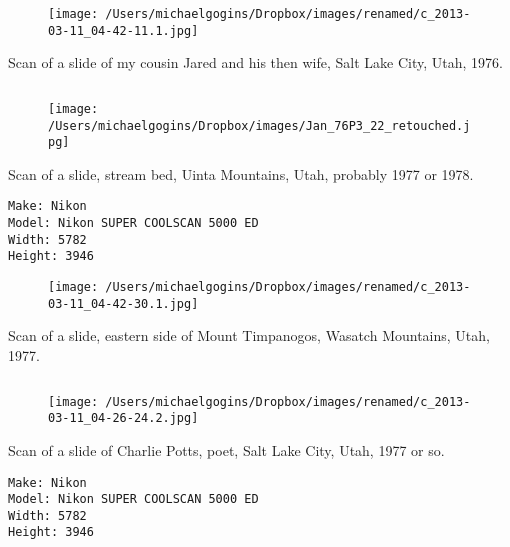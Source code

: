 \documentclass[11pt,letter,DIV=14,paper=landscape]{scrbook}
\begin{document}
\begin{figure}
\texttt{[image: /Users/michaelgogins/Dropbox/images/renamed/c\_2013-03-11\_04-42-11.1.jpg]}
\end{figure}
    
\clearpage
\noindent Scan of a slide of my cousin Jared and his then wife, Salt Lake City, Utah, 1976.
\noindent
\begin{lstlisting}
\end{lstlisting}
\clearpage

\begin{figure}
\texttt{[image: /Users/michaelgogins/Dropbox/images/Jan\_76P3\_22\_retouched.jpg]}
\end{figure}
    
\clearpage
\noindent Scan of a slide, stream bed, Uinta Mountains, Utah, probably 1977 or 1978.
\noindent
\begin{lstlisting}
Make: Nikon
Model: Nikon SUPER COOLSCAN 5000 ED
Width: 5782
Height: 3946
\end{lstlisting}
\clearpage

\begin{figure}
\texttt{[image: /Users/michaelgogins/Dropbox/images/renamed/c\_2013-03-11\_04-42-30.1.jpg]}
\end{figure}
    
\clearpage
\noindent Scan of a slide, eastern side of Mount Timpanogos, Wasatch Mountains, Utah, 1977.
\noindent
\begin{lstlisting}
\end{lstlisting}
\clearpage

\begin{figure}
\texttt{[image: /Users/michaelgogins/Dropbox/images/renamed/c\_2013-03-11\_04-26-24.2.jpg]}
\end{figure}
    
\clearpage
\noindent Scan of a slide of Charlie Potts, poet, Salt Lake City, Utah, 1977 or so.
\noindent
\begin{lstlisting}
Make: Nikon
Model: Nikon SUPER COOLSCAN 5000 ED
Width: 5782
Height: 3946
\end{lstlisting}
\clearpage
\end{document}

